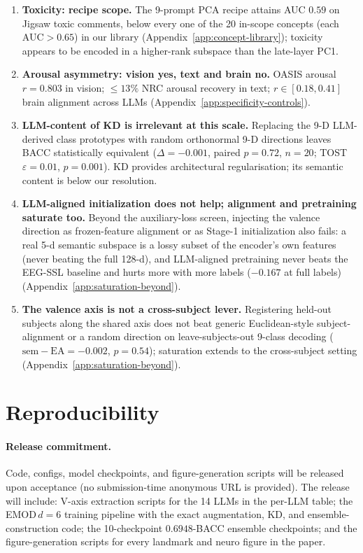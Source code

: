 \begin{enumerate}
{ensemble} ($0.6753 \to 0.6720$). Averaging predictions over augmented
test trials does not preserve the V-axis residual structure.
\item \textbf{Toxicity: recipe scope.} The 9-prompt PCA recipe attains
AUC $0.59$ on Jigsaw toxic comments, below every one of the 20
in-scope concepts (each AUC$>0.65$) in our library
(Appendix~\ref{app:concept-library}); toxicity appears
to be encoded in a higher-rank subspace than the late-layer PC1.
\item \textbf{Arousal asymmetry: vision yes, text and brain no.}
OASIS arousal $r=0.803$ in vision; $\le 13\%$ NRC arousal recovery in
text; $r \in [0.18, 0.41]$ brain alignment across LLMs
(Appendix~\ref{app:specificity-controls}).
\item \textbf{LLM-content of KD is irrelevant at this scale.} Replacing
the 9-D LLM-derived class prototypes with random orthonormal 9-D
directions leaves BACC statistically equivalent ($\Delta{=}{-}0.001$,
paired $p{=}0.72$, $n{=}20$; TOST $\varepsilon{=}0.01$, $p{=}0.001$).
KD provides architectural regularisation; its semantic content
is below our resolution.
\item \textbf{LLM-aligned initialization does not help; alignment and
pretraining saturate too.} Beyond the auxiliary-loss screen, injecting the
valence direction as frozen-feature alignment or as Stage-1
initialization also fails: a real 5-d semantic subspace is a lossy subset
of the encoder's own features (never beating the full 128-d), and
LLM-aligned pretraining never beats the EEG-SSL baseline and hurts more
with more labels ($-0.167$ at full labels)
(Appendix~\ref{app:saturation-beyond}).
\item \textbf{The valence axis is not a cross-subject lever.} Registering
held-out subjects along the shared axis does not beat generic
Euclidean-style subject-alignment or a random direction on
leave-subjects-out 9-class decoding ($\mathrm{sem}{-}\mathrm{EA}={-}0.002$,
$p{=}0.54$); saturation extends to the cross-subject setting
(Appendix~\ref{app:saturation-beyond}).
\end{enumerate}


\section{Reproducibility}
\label{app:repro}

\paragraph{Release commitment.} Code, configs, model checkpoints, and
figure-generation scripts will be released upon acceptance (no
submission-time anonymous URL is provided). The release will include:
V-axis extraction scripts for the 14 LLMs in the per-LLM table;
the EMOD\,$d{=}6$ training pipeline with the exact augmentation, KD,
and ensemble-construction code; the 10-checkpoint $0.6948$-BACC
ensemble checkpoints; and the figure-generation scripts for every
landmark and neuro figure in the paper.

